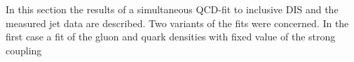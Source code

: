 In this section the results of a simultaneous QCD-fit to inclusive DIS and the measured jet data are described. Two variants of the fits were concerned. In the first case a fit of the gluon and quark densities with fixed value of the strong coupling 

